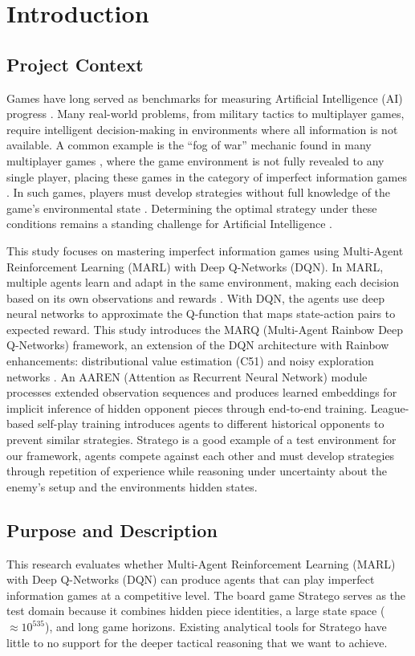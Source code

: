 \chapter{Introduction}
\section{Project Context}
Games have long served as benchmarks for measuring Artificial Intelligence (AI) progress \cite{StudeGame}. Many real-world problems, from military tactics to multiplayer games, require intelligent decision-making in environments where all information is not available. A common example is the ``fog of war'' mechanic found in many multiplayer games \cite{FogofWar}, where the game environment is not fully revealed to any single player, placing these games in the category of imperfect information games \cite{DRLImperfectInfo2023}. In such games, players must develop strategies without full knowledge of the game's environmental state \cite{FogofWar}. Determining the optimal strategy under these conditions remains a standing challenge for Artificial Intelligence \cite{li2024opponent}.

This study focuses on mastering imperfect information games using Multi-Agent Reinforcement Learning (MARL) with Deep Q-Networks (DQN). In MARL, multiple agents learn and adapt in the same environment, making each decision based on its own observations and rewards \cite{2509_03682v1}. With DQN, the agents use deep neural networks to approximate the Q-function that maps state-action pairs to expected reward. This study introduces the MARQ (Multi-Agent Rainbow Deep Q-Networks) framework, an extension of the DQN architecture with Rainbow enhancements: distributional value estimation (C51) and noisy exploration networks \cite{RainbowJMLR2021}. An AAREN (Attention as Recurrent Neural Network) module \cite{Aaren} processes extended observation sequences and produces learned embeddings for implicit inference of hidden opponent pieces through end-to-end training. League-based self-play training \cite{perolat2022stratego} introduces agents to different historical opponents to prevent similar strategies. Stratego is a good example of a test environment for our framework, agents compete against each other and must develop strategies through repetition of experience while reasoning under uncertainty about the enemy's setup and the environments hidden states.



\section{Purpose and Description}
This research evaluates whether Multi-Agent Reinforcement Learning (MARL) with Deep Q-Networks (DQN) can produce agents that can play imperfect information games at a competitive level. The board game Stratego serves as the test domain because it combines hidden piece identities, a large state space ($\approx 10^{535}$), and long game horizons. Existing analytical tools for Stratego have little to no support for the deeper tactical reasoning that we want to achieve. 

